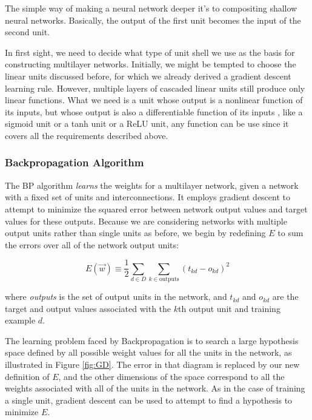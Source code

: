 \documentclass{article}
\begin{document}
The simple way of making a neural network deeper it's to compositing shallow neural networks. Basically, the output of the first unit becomes the input of the second unit. 

In first sight, we need to decide what type of unit shell we use as the basis for constructing multilayer networks. Initially, we might be tempted to choose the linear units discussed before, for which we already derived a gradient descent learning rule. However, multiple layers of cascaded linear units still produce only linear functions. What we need is a unit whose output is a nonlinear function of its inputs, but whose output is also a differentiable function of its inputs , like a sigmoid unit or a tanh unit or a ReLU unit, any function can be use since it covers all the requirements described above.



\subsubsection{Backpropagation Algorithm }
The BP algorithm \textit{learns} the weights for a multilayer network, given a network with a fixed set of units and interconnections. It employs gradient descent to attempt to minimize the squared error between network output values and target values for these outputs.
Because we are considering networks with multiple output units rather than single units as before, we begin by redefining $E$ to sum the errors over all of the network output units:

\begin{equation}
    E(\Vec{w}) \equiv \frac{1}{2} \sum_{d \in D} \sum_{k \in \text{outputs}} (t_{kd} - o_{kd})^2
\end{equation}

where \textit{outputs} is the set of output units in the network, and $t_{kd}$ and $o_{kd}$ are the target and output values associated with the $k$th output unit and training example $d$.

The learning problem faced by Backpropagation is to search a large hypothesis space defined by all possible weight values for all the units in the network, as illustrated in Figure \ref{fig:GD}. The error in that diagram is replaced by our new definition of $E$, and the other dimensions of the space correspond to all the weights associated with all of the units in the network. As in the case of training a single unit, gradient descent can be used to attempt to find a hypothesis to minimize $E$.
\end{document}
